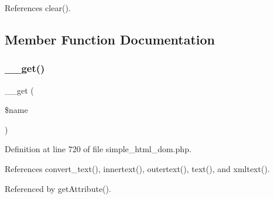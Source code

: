 References clear().




\subsection{Member Function Documentation}
\hypertarget{classsimple__html__dom__node_abc8e9e31bb15c8a44c3210ec551407c8}{}\label{classsimple__html__dom__node_abc8e9e31bb15c8a44c3210ec551407c8} 
\subsubsection{\texorpdfstring{\+\_\+\+\_\+get()}{\_\_get()}}
{\footnotesize\ttfamily \+\_\+\+\_\+get (\begin{DoxyParamCaption}\item[{}]{\$name }\end{DoxyParamCaption})}



Definition at line 720 of file simple\+\_\+html\+\_\+dom.\+php.



References convert\+\_\+text(), innertext(), outertext(), text(), and xmltext().



Referenced by get\+Attribute().


